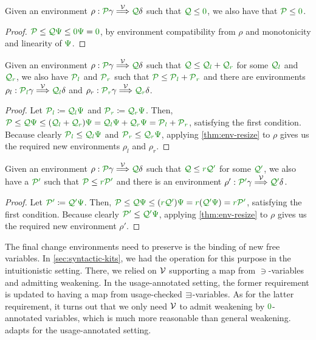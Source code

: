 \begin{lemma}\label{thm:lr-env-zero}
  Given an environment $\rho : \grP\gamma \env\V \grQ\delta$ such that
  $\grQ \leq \gr 0$, we also have that $\grP \leq \gr 0$.
\end{lemma}
\begin{proof}
  $\grP \leq \grQ\gr\Psi \leq \gr0\gr\Psi = \gr0$, by environment
  compatibility from $\rho$ and monotonicity and linearity of $\gr\Psi$.
\end{proof}

\begin{lemma}\label{thm:lr-env-add}
  Given an environment $\rho : \grP\gamma \env\V \grQ\delta$ such that
  $\grQ \leq \grQl + \grQr$ for some $\grQl$ and $\grQr$, we also have $\grPl$
  and $\grPr$ such that $\grP \leq \grPl + \grPr$ and there are environments
  $\rho_l : \grPl\gamma \env\V \grQl\delta$ and
  $\rho_r : \grPr\gamma \env\V \grQr\delta$.
\end{lemma}
\begin{proof}
  Let $\grPl \coloneqq \grQl\gr\Psi$ and $\grPr \coloneqq \grQr\gr\Psi$.
  Then, $\grP \leq \grQ\gr\Psi \leq \plr{\grQl + \grQr}\gr\Psi =
  \grQl\gr\Psi + \grQr\gr\Psi = \grPl + \grPr$, satisfying the first condition.
  Because clearly $\grPl \leq \grQl\gr\Psi$ and $\grPr \leq \grQr\gr\Psi$,
  applying \cref{thm:env-resize} to $\rho$ gives us the required
  new environments $\rho_l$ and $\rho_r$.
\end{proof}

\begin{lemma}\label{thm:lr-env-scale}
  Given an environment $\rho : \grP\gamma \env\V \grQ\delta$ such that
  $\grQ \leq \gr r\grQprime$ for some $\grQprime$, we also have a $\grPprime$
  such that $\grP \leq \gr r\grPprime$ and there is an environment
  $\rho' : \grPprime\gamma \env\V \grQprime\delta$.
\end{lemma}
\begin{proof}
  Let $\grPprime \coloneqq \grQprime\gr\Psi$.
  Then, $\grP \leq \grQ\gr\Psi \leq \plr{\gr r\grQprime}\gr\Psi =
  \gr r\plr{\grQprime\gr\Psi} = \gr r\grPprime$, satisfying the first condition.
  Because clearly $\grPprime \leq \grQprime\gr\Psi$,
  applying \cref{thm:env-resize} to $\rho$ gives us the required
  new environment $\rho'$.
\end{proof}

The final change environments need to preserve is the binding of new free
variables.
In \cref{sec:syntactic-kits}, we had the operation  for
this purpose in the intuitionistic setting.
There, we relied on $\mathcal V$ supporting a map from $\ni$-variables and admitting
weakening.
In the usage-annotated setting, the former requirement is updated to having a
map from usage-checked $\sqni$-variables.
As for the latter requirement, it turns out that we only need $\mathcal V$ to admit
weakening by $\gr0$-annotated variables, which is much more reasonable than
general weakening.
 adapts  for the usage-annotated
setting.

